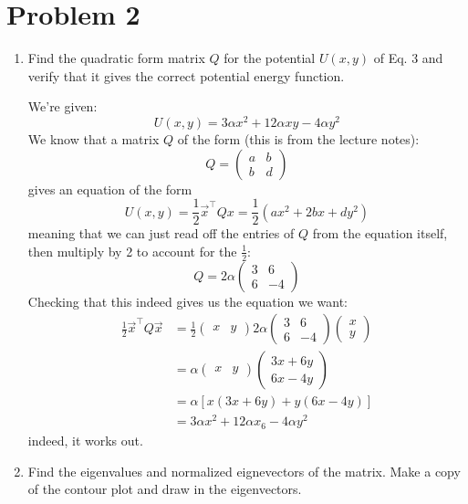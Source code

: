 \documentclass[10pt]{article}
\begin{document}
		\section*{Problem 2}
		\begin{enumerate}[label=\alph*)]
			\item Find the quadratic form matrix $Q$ for the potential $U(x, y)$ of Eq. 3 and verify that it gives the 
		correct potential energy function.

		\begin{solution}
			We're given:
			\[
			U(x, y) = 3\alpha x^2 + 12 \alpha xy - 4\alpha y^2
			\] 
			We know that a matrix $Q$ of the form (this is from the lecture notes):
			\[
				Q = \begin{pmatrix} a & b\\b & d \end{pmatrix} 
			\] 
			gives an equation of the form
			\[
			U(x, y) = \frac{1}{2}\vec x^\top Q x = \frac{1}{2}(ax^2 + 2bx + dy^2)
			\] 
			meaning that we can just read off the entries of $Q$ from the equation itself, then multiply 
			by 2 to account for the $\frac{1}{2}$:
			\[
				Q = 2 \alpha \begin{pmatrix} 3 & 6 \\ 6 & -4 \end{pmatrix} 
			\] 
			Checking that this indeed gives us the equation we want:
			\begin{align*}
				\frac{1}{2}\vec x^\top Q \vec x &= \frac{1}{2}\begin{pmatrix} x & y \end{pmatrix} 
				2 \alpha \begin{pmatrix} 3 & 6\\ 6 & -4 \end{pmatrix} \begin{pmatrix} x\\y \end{pmatrix} \\
										   &= \alpha\begin{pmatrix} x & y \end{pmatrix} 
										   \begin{pmatrix} 3x + 6y\\ 6x - 4y \end{pmatrix} \\
										   &= \alpha[x(3x + 6y) + y(6x - 4y)] \\
										   &= 3\alpha x^2 + 12 \alpha x_6 - 4\alpha y^2
			\end{align*}
			indeed, it works out. 
		\end{solution}
	\item Find the eigenvalues and normalized eignevectors of the matrix. Make a copy of the contour plot and 
		draw in the eigenvectors. 


\end{enumerate}
\end{document}
